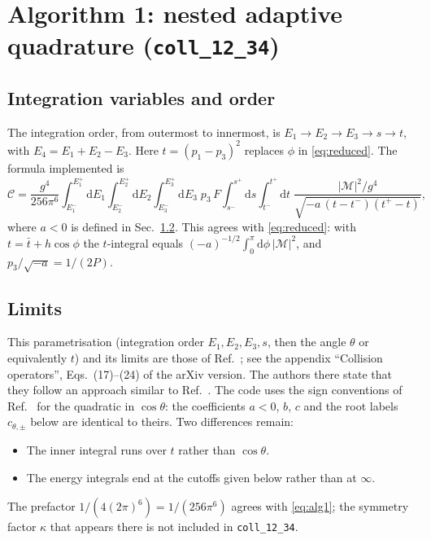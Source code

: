 \documentclass[11pt,a4paper]{article}
\newcommand{\dd}{\mathrm{d}}
\newcommand{\Msq}{|\mathcal{M}|^2}
\newcommand{\code}[1]{\texttt{#1}}
\begin{document}
\section{\texorpdfstring{Algorithm 1: nested adaptive quadrature (\code{coll\_12\_34})}{Algorithm 1: nested adaptive quadrature}}

\subsection{Integration variables and order}

The integration order, from outermost to innermost, is
$E_1\to E_2\to E_3\to s\to t$, with $E_4=E_1+E_2-E_3$. Here $t=(p_1-p_3)^2$
replaces $\phi$ in \eqref{eq:reduced}. The formula implemented is
\begin{equation}
  \mathcal{C} = \frac{g^4}{256\pi^6}
  \int_{E_1^-}^{E_1^+}\!\dd E_1
  \int_{E_2^-}^{E_2^+}\!\dd E_2
  \int_{E_3^-}^{E_3^+}\!\dd E_3\;p_3\,F
  \int_{s^-}^{s^+}\!\dd s
  \int_{t^-}^{t^+}\!\dd t\;
  \frac{\Msq/g^4}{\sqrt{-a\,(t-t^-)(t^+-t)}} ,
  \label{eq:alg1}
\end{equation}
where $a<0$ is defined in Sec.~\ref{sec:alg1-limits}. This agrees with
\eqref{eq:reduced}: with $t=\bar t+h\cos\phi$ the $t$-integral equals
$(-a)^{-1/2}\int_0^\pi\dd\phi\,\Msq$, and $p_3/\sqrt{-a}=1/(2P)$.

\subsection{Limits}
\label{sec:alg1-limits}

This parametrisation (integration order $E_1,E_2,E_3,s$, then the angle
$\theta$ or equivalently $t$) and its limits are those of
Ref.~\cite{Bringmann:2022aim}; see the appendix ``Collision operators'',
Eqs.~(17)--(24) of the arXiv version. The authors there state that they
follow an approach similar to Ref.~\cite{Ala-Mattinen:2022nuj}. The code
uses the sign conventions of Ref.~\cite{Bringmann:2022aim} for the quadratic
in $\cos\theta$: the coefficients $a<0$, $b$, $c$ and the root labels
$c_{\theta,\pm}$ below are identical to theirs. Two differences remain:
\begin{itemize}
\item The inner integral runs over $t$ rather than $\cos\theta$.
\item The energy integrals end at the cutoffs given below rather than at $\infty$.
\end{itemize}
The prefactor $1/(4(2\pi)^6)=1/(256\pi^6)$ agrees with \eqref{eq:alg1}; the
symmetry factor $\kappa$ that appears there is not included in \code{coll\_12\_34}.
\end{document}
